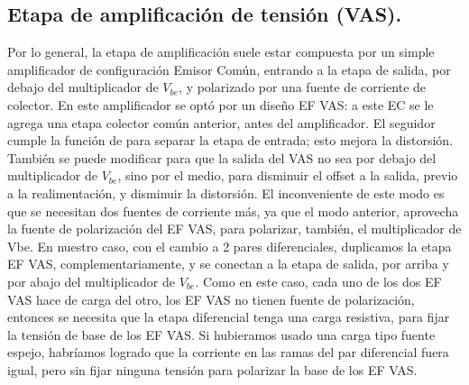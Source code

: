 \subsection{Etapa de amplificación de tensión (VAS).}

Por lo general, la etapa de amplificación suele estar compuesta por un simple amplificador de configuración Emisor Común, entrando a la etapa de salida, por debajo del multiplicador de $V_{be}$, y polarizado por una fuente de corriente de colector. En este amplificador se optó por un diseño EF VAS: a este EC se le agrega una etapa colector común anterior, antes del amplificador. El seguidor cumple la función de para separar la etapa de entrada; esto mejora la distorsión. También se puede modificar para que la salida del VAS no sea por debajo del multiplicador de $V_{be}$, sino por el medio, para disminuir el offset a la salida, previo a la realimentación, y disminuir la distorsión. El inconveniente de este modo es que se necesitan dos fuentes de corriente más, ya que el modo anterior, aprovecha la fuente de polarización del EF VAS, para polarizar, también, el multiplicador de Vbe. En nuestro caso, con el cambio a 2 pares diferenciales, duplicamos la etapa EF VAS, complementariamente, y se conectan a la etapa de salida, por arriba y por abajo del multiplicador de $V_{be}$. Como en este caso, cada uno de los dos EF VAS hace de carga del otro, los EF VAS no tienen fuente de polarización, entonces se necesita que la etapa diferencial tenga una carga resistiva, para fijar la tensión de base de los EF VAS. Si hubieramos usado una carga tipo fuente espejo, habríamos logrado que la corriente en las ramas del par diferencial fuera igual, pero sin fijar ninguna tensión para polarizar la base de los EF VAS.


